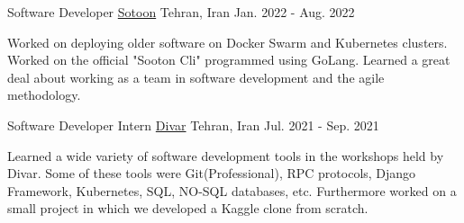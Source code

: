 

\begin{cventries}

  \cventry
    {Software Developer} %
    {\href{https://sotoon.ir}{Sotoon}} %
    {Tehran, Iran} %
    {Jan. 2022 - Aug. 2022} %
    {
      \begin{cvitems} %
        \item {Worked on deploying older software on Docker Swarm and Kubernetes clusters. Worked on the official "Sooton Cli" programmed using GoLang. Learned a great deal about working as a team in software development and the agile methodology. }
      \end{cvitems}
    }

  \cventry
    {Software Developer Intern} %
    {\href{https://divar.ir}{Divar}} %
    {Tehran, Iran} %
    {Jul. 2021 - Sep. 2021} %
    {
      \begin{cvitems} %
        \item { Learned a wide variety of software development tools in the workshops held by Divar. Some of these tools were Git(Professional), RPC protocols, Django Framework, Kubernetes, SQL, NO-SQL databases, etc. Furthermore worked on a small project in which we developed a Kaggle clone from scratch.}
      \end{cvitems}
    }

\end{cventries}
